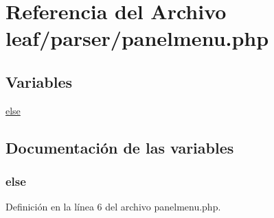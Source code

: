 \hypertarget{panelmenu_8php}{\section{Referencia del Archivo leaf/parser/panelmenu.php}
\label{panelmenu_8php}
}
\subsection*{Variables}
\begin{DoxyCompactItemize}
\item 
\hyperlink{panelmenu_8php_a0544c3fe466e421738dae463968b70ba}{else}
\end{DoxyCompactItemize}


\subsection{Documentación de las variables}
\hypertarget{panelmenu_8php_a0544c3fe466e421738dae463968b70ba}{
\subsubsection[{else}]{\setlength{\rightskip}{0pt plus 5cm}else}}\label{panelmenu_8php_a0544c3fe466e421738dae463968b70ba}


Definición en la línea 6 del archivo panelmenu.\-php.

